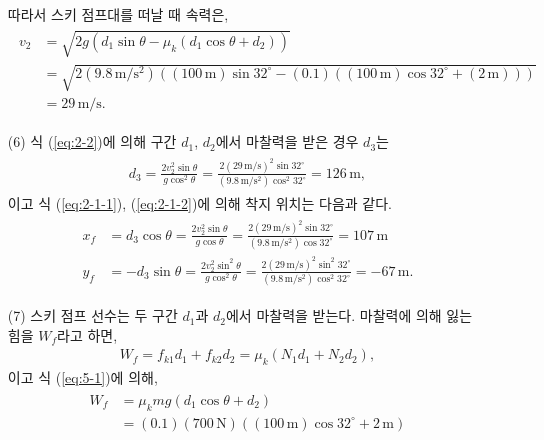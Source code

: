 \documentclass[floatfix,nofootinbib,superscriptaddress,fleqn]{revtex4-2}
\begin{document}
\begin{itemize}
\begin{align}
  \end{align} 
  따라서 스키 점프대를 떠날 때 속력은,
  \begin{align}
    \begin{split}
      v_2&=\sqrt{2g\left( d_1\sin{\theta}
      -\mu_k(d_1\cos{\theta}+d_2)\right)} \\
      &= \sqrt{2(9.8\,\mathrm{m/s^2})
      \left((100\,\mathrm{m})\sin{32^\circ}
      -(0.1)((100\,\mathrm{m})\cos{32^\circ}
      +(2\,\mathrm{m}))\right)} \\
      &= 29\,\mathrm{m/s}.
    \end{split}
  \end{align}
  \item[(6)] 식 (\ref{eq:2-2})에 의해 구간 $d_1$, $d_2$에서 마찰력을
  받은 경우 $d_3$는
  \begin{align}
    \begin{split}
      d_3 = \frac{2v^2_2\sin{\theta}}{g\cos^2{\theta}}
      =\frac{2(29\,\mathrm{m/s})^2\sin{32^\circ}}
      {(9.8\,\mathrm{m/s^2})\cos^2{32^\circ}}
      =126\,\mathrm{m},
    \end{split}
  \end{align} 
  이고 식 (\ref{eq:2-1-1}), (\ref{eq:2-1-2})에 의해 착지 위치는 다음과 같다.
  \begin{align}
    \begin{split}
      x_f &= d_3\cos{\theta}
      =\frac{2v^2_2\sin{\theta}}{g\cos{\theta}}
      =\frac{2(29\,\mathrm{m/s})^2\sin{32^\circ}}
      {(9.8\,\mathrm{m/s^2})\cos{32^\circ}}
      =107\,\mathrm{m} \\
      y_f &= -d_3\sin{\theta}
      =\frac{2v^2_2\sin^2{\theta}}{g\cos^2{\theta}}
      =\frac{2(29\,\mathrm{m/s})^2\sin^2{32^\circ}}
      {(9.8\,\mathrm{m/s^2})\cos^2{32^\circ}}
      =-67\,\mathrm{m}.
    \end{split}
  \end{align}
  \item[(7)] 스키 점프 선수는 두 구간 $d_1$과 $d_2$에서 마찰력을 받는다. 
  마찰력에 의해 잃는 힘을 $W_f$라고 하면,
  \begin{align}
    W_f = f_{k1}d_1+f_{k2}d_2  = \mu_k(N_1d_1+N_2d_2),
  \end{align}
  이고 식 (\ref{eq:5-1})에 의해,
  \begin{align}
    \begin{split}
      W_f &= \mu_kmg(d_1\cos{\theta}+d_2)  \\
      &= (0.1)(700\,\mathrm{N})\left((100\,\mathrm{m})\cos{32^\circ}
      +2\,\mathrm{m}\right) \\

\end{split}
\end{align}
\end{itemize}
\end{document}
